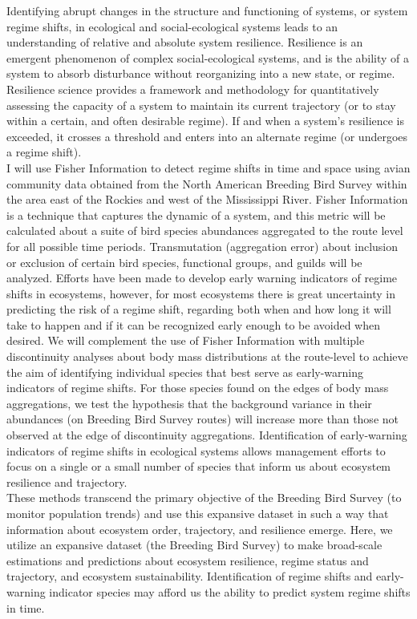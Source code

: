 \documentclass[12pt,twoside,openany]{reedthesis}
\begin{document}
Identifying abrupt changes in the structure and functioning of systems, or system regime shifts, in ecological and social-ecological systems leads to an understanding of relative and absolute system resilience. Resilience is an emergent phenomenon of complex social-ecological systems, and is the ability of a system to absorb disturbance without reorganizing into a new state, or regime. Resilience science provides a framework and methodology for quantitatively assessing the capacity of a system to maintain its current trajectory (or to stay within a certain, and often desirable regime). If and when a system's resilience is exceeded, it crosses a threshold and enters into an alternate regime (or undergoes a regime shift).\\
I will use Fisher Information to detect regime shifts in time and space using avian community data obtained from the North American Breeding Bird Survey within the area east of the Rockies and west of the Mississippi River. Fisher Information is a technique that captures the dynamic of a system, and this metric will be calculated about a suite of bird species abundances aggregated to the route level for all possible time periods. Transmutation (aggregation error) about inclusion or exclusion of certain bird species, functional groups, and guilds will be analyzed. Efforts have been made to develop early warning indicators of regime shifts in ecosystems, however, for most ecosystems there is great uncertainty in predicting the risk of a regime shift, regarding both when and how long it will take to happen and if it can be recognized early enough to be avoided when desired. We will complement the use of Fisher Information with multiple discontinuity analyses about body mass distributions at the route-level to achieve the aim of identifying individual species that best serve as early-warning indicators of regime shifts. For those species found on the edges of body mass aggregations, we test the hypothesis that the background variance in their abundances (on Breeding Bird Survey routes) will increase more than those not observed at the edge of discontinuity aggregations. Identification of early-warning indicators of regime shifts in ecological systems allows management efforts to focus on a single or a small number of species that inform us about ecosystem resilience and trajectory.\\
These methods transcend the primary objective of the Breeding Bird Survey (to monitor population trends) and use this expansive dataset in such a way that information about ecosystem order, trajectory, and resilience emerge. Here, we utilize an expansive dataset (the Breeding Bird Survey) to make broad-scale estimations and predictions about ecosystem resilience, regime status and trajectory, and ecosystem sustainability. Identification of regime shifts and early-warning indicator species may afford us the ability to predict system regime shifts in time.
\end{document}
